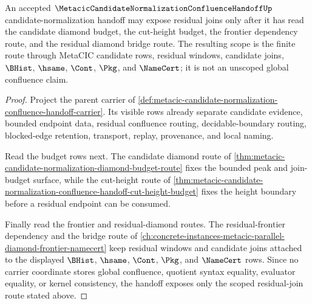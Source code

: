 \begin{theorem}\label{thm:metacic-candidate-normalization-residual-join-scope}
An accepted $\MetacicCandidateNormalizationConfluenceHandoffUp$ candidate-normalization handoff may expose residual joins only after it has read the candidate diamond budget, the cut-height budget, the frontier dependency route, and the residual diamond bridge route. The resulting scope is the finite route through MetaCIC candidate rows, residual windows, candidate joins, $\BHist$, $\hsame$, $\Cont$, $\Pkg$, and $\NameCert$; it is not an unscoped global confluence claim.
\end{theorem}
\begin{proof}
Project the parent carrier of \autoref{def:metacic-candidate-normalization-confluence-handoff-carrier}. Its visible rows already separate candidate evidence, bounded endpoint data, residual confluence routing, decidable-boundary routing, blocked-edge retention, transport, replay, provenance, and local naming.

Read the budget rows next. The candidate diamond route of \autoref{thm:metacic-candidate-normalization-diamond-budget-route} fixes the bounded peak and join-budget surface, while the cut-height route of \autoref{thm:metacic-candidate-normalization-confluence-handoff-cut-height-budget} fixes the height boundary before a residual endpoint can be consumed.

Finally read the frontier and residual-diamond routes. The residual-frontier dependency and the bridge route of \autoref{ch:concrete-instances-metacic-parallel-diamond-frontier-namecert} keep residual windows and candidate joins attached to the displayed $\BHist$, $\hsame$, $\Cont$, $\Pkg$, and $\NameCert$ rows. Since no carrier coordinate stores global confluence, quotient syntax equality, evaluator equality, or kernel consistency, the handoff exposes only the scoped residual-join route stated above.
\end{proof}

